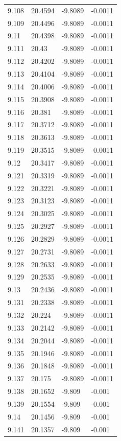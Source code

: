 \begin{tabular}{llll}
9.108 & 20.4594 & -9.8089 & -0.0011 \\
9.109 & 20.4496 & -9.8089 & -0.0011 \\
9.11 & 20.4398 & -9.8089 & -0.0011 \\
9.111 & 20.43 & -9.8089 & -0.0011 \\
9.112 & 20.4202 & -9.8089 & -0.0011 \\
9.113 & 20.4104 & -9.8089 & -0.0011 \\
9.114 & 20.4006 & -9.8089 & -0.0011 \\
9.115 & 20.3908 & -9.8089 & -0.0011 \\
9.116 & 20.381 & -9.8089 & -0.0011 \\
9.117 & 20.3712 & -9.8089 & -0.0011 \\
9.118 & 20.3613 & -9.8089 & -0.0011 \\
9.119 & 20.3515 & -9.8089 & -0.0011 \\
9.12 & 20.3417 & -9.8089 & -0.0011 \\
9.121 & 20.3319 & -9.8089 & -0.0011 \\
9.122 & 20.3221 & -9.8089 & -0.0011 \\
9.123 & 20.3123 & -9.8089 & -0.0011 \\
9.124 & 20.3025 & -9.8089 & -0.0011 \\
9.125 & 20.2927 & -9.8089 & -0.0011 \\
9.126 & 20.2829 & -9.8089 & -0.0011 \\
9.127 & 20.2731 & -9.8089 & -0.0011 \\
9.128 & 20.2633 & -9.8089 & -0.0011 \\
9.129 & 20.2535 & -9.8089 & -0.0011 \\
9.13 & 20.2436 & -9.8089 & -0.0011 \\
9.131 & 20.2338 & -9.8089 & -0.0011 \\
9.132 & 20.224 & -9.8089 & -0.0011 \\
9.133 & 20.2142 & -9.8089 & -0.0011 \\
9.134 & 20.2044 & -9.8089 & -0.0011 \\
9.135 & 20.1946 & -9.8089 & -0.0011 \\
9.136 & 20.1848 & -9.8089 & -0.0011 \\
9.137 & 20.175 & -9.8089 & -0.0011 \\
9.138 & 20.1652 & -9.809 & -0.001 \\
9.139 & 20.1554 & -9.809 & -0.001 \\
9.14 & 20.1456 & -9.809 & -0.001 \\
9.141 & 20.1357 & -9.809 & -0.001 \\

\end{tabular}
